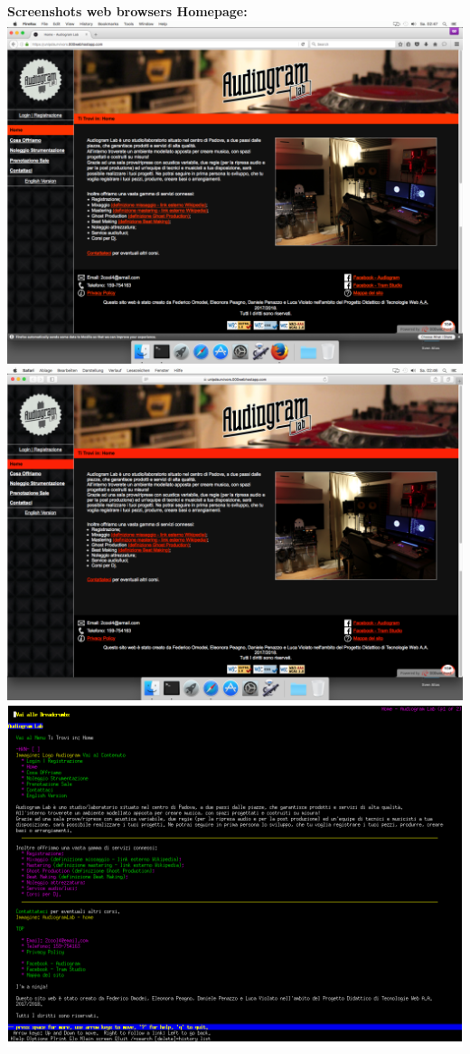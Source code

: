 \pagebreak

\begin{center}
\textbf{Screenshots web browsers Homepage: }
\vfill
\includegraphics[scale=2.5]{Images/Firefox45.png}
\vfill
\includegraphics[scale=0.7]{Images/Safari913MacOSX108.png}
\vfill
\includegraphics[scale=0.7]{Images/Lynx288Ubuntu1204LTS.png}

\end{center}
